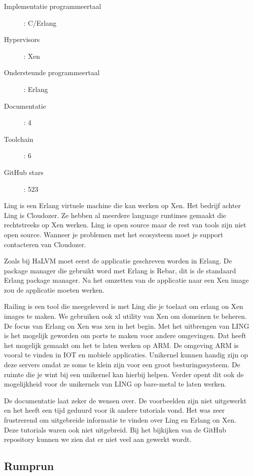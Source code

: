 \documentclass[pdftex,a4paper,12pt,twoside]{report}
\begin{document}
\begin{description}
  \item [Implementatie programmeertaal]: C/Erlang
  \item [Hypervisors]: Xen
  \item [Ondersteunde programmeertaal]: Erlang
  \item [Documentatie]: 4
  \item [Toolchain]: 6
  \item [GitHub stars]: 523
\end{description}

Ling is een Erlang virtuele machine die kan werken op Xen. Het bedrijf achter Ling is Cloudozer. Ze hebben al meerdere language runtimes gemaakt die rechtstreeks op Xen werken.
Ling is open source maar de rest van tools zijn niet open source. Wanneer je problemen met het ecosysteem moet je support contacteren van Cloudozer.

Zoals bij HaLVM moet eerst de applicatie geschreven worden in Erlang. De package manager die gebruikt word met Erlang is Rebar, dit is de standaard Erlang package manager. Na het omzetten van de applicatie naar een Xen image zou de applicatie moeten werken.

Railing is een tool die meegeleverd is met Ling die je toelaat om erlang on Xen images te maken. We gebruiken ook xl utility van Xen om domeinen te beheren. 
De focus van Erlang on Xen was xen in het begin. Met het uitbrengen van LING is het mogelijk geworden om ports te maken voor andere omgevingen. Dat heeft het mogelijk gemaakt om het te laten werken op ARM. De omgeving ARM is vooral te vinden in IOT en mobiele applicaties. Unikernel kunnen handig zijn op deze servers omdat ze soms te klein zijn voor een groot besturingssysteem. De ruimte die je wint bij een unikernel kan hierbij helpen. Verder opent dit ook de mogelijkheid voor de unikernels van LING op bare-metal te laten werken.

De documentatie laat zeker de wensen over. De voorbeelden zijn niet uitgewerkt en het heeft een tijd geduurd voor ik andere tutorials vond. 
Het was zeer frustrerend om uitgebreide informatie te vinden over Ling en Erlang on Xen.
Deze tutorials waren ook niet uitgebreid. Bij het bijkijken van de GitHub repository kunnen we zien dat er niet veel aan gewerkt wordt.

\newpage

\subsection{Rumprun}
\end{document}
